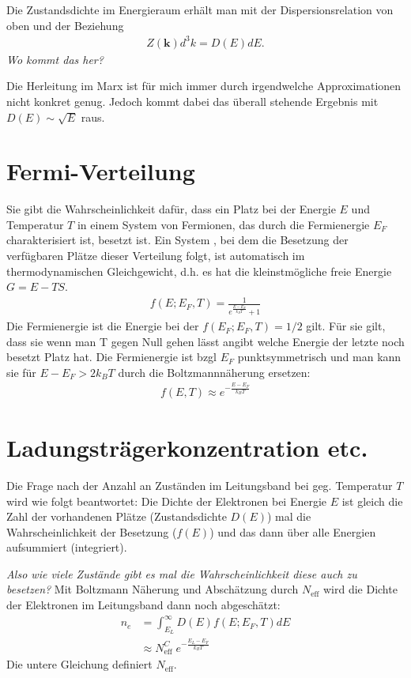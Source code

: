 \documentclass[paper=a4,10pt]{scrartcl}
\begin{document}
Die Zustandsdichte im Energieraum erhält man mit der Dispersionsrelation von oben und der Beziehung
\begin{align}
Z(\bm k) d^3k = D(E)dE.
\end{align} 
\textit{Wo kommt das her?}

Die Herleitung im Marx ist für mich immer durch irgendwelche Approximationen nicht konkret genug. Jedoch kommt dabei das überall stehende Ergebnis mit $D(E) \sim \sqrt{E}$ raus.

\section{Fermi-Verteilung}
Sie gibt die Wahrscheinlichkeit dafür, dass ein Platz bei der Energie $E$ und Temperatur $T$ in einem System von Fermionen, das durch die Fermienergie $E_F$ charakterisiert ist, besetzt ist.
Ein System , bei dem die Besetzung der verfügbaren Plätze dieser Verteilung folgt, ist automatisch im thermodynamischen Gleichgewicht, d.h. es hat die kleinstmögliche freie Energie $G = E-TS$.
\begin{align}
f(E;E_F, T) = \frac{1}{e^{\frac{E-E_F}{k_BT}}+1}
\end{align}
Die Fermienergie ist die Energie bei der $f(E_F; E_F, T) = 1/2$ gilt. Für sie gilt, dass sie wenn man T gegen Null gehen lässt angibt welche Energie der letzte noch besetzt Platz hat.
Die Fermienergie ist bzgl $E_F$ punktsymmetrisch und man kann sie für $E-E_F > 2k_BT$ durch die Boltzmannnäherung ersetzen:
\begin{align}
f(E,T) \approx e^{-\frac{E-E_F}{k_BT}}
\end{align}

\section{Ladungsträgerkonzentration etc.}
\label{seq:ladungskonz}
Die Frage nach der Anzahl an Zuständen im Leitungsband bei geg. Temperatur $T$ wird wie folgt beantwortet: Die Dichte der Elektronen bei Energie $E$ ist gleich die Zahl der vorhandenen Plätze (Zustandsdichte $D(E)$) mal die Wahrscheinlichkeit der Besetzung ($f(E)$) und das dann über alle Energien aufsummiert (integriert).

\textit{Also wie viele Zustände gibt es mal die Wahrscheinlichkeit diese auch zu besetzen?}
Mit Boltzmann Näherung und Abschätzung durch $N_{\text{eff}}$ wird die Dichte der Elektronen im Leitungsband dann noch abgeschätzt:
\begin{align}
\label{eq:ne}
n_e &= \int^{\infty}_{E_L} D(E) f(E; E_F, T) dE \\
&\approx N^C_{\text{eff}} \;  e^{-\frac{E_L-E_F}{k_B T}}
\end{align}
Die untere Gleichung definiert $N_{\text{eff}}$.
\end{document}
